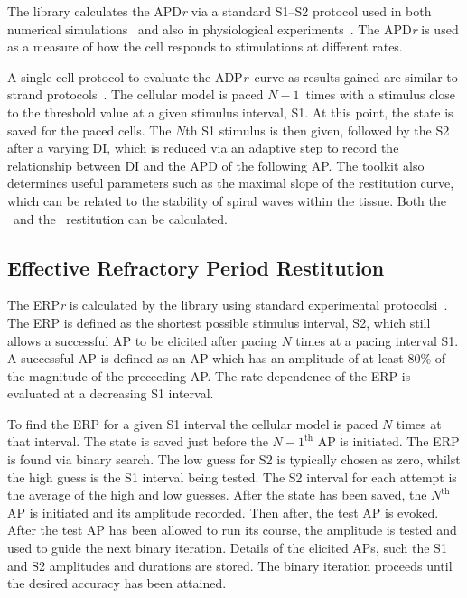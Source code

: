 The library calculates the APD\emph{r} via a standard S1--S2 protocol used in both
numerical simulations~\cite{Kim2002,Xie2002,Qu1999,Cherry2004,Cherry2007,Decker2009} and also in physiological
experiments~\cite{Boyett1978,Taggart1996}.  The APD\emph{r} is used
as a measure of how the cell responds to stimulations at different rates.

A single cell protocol to evaluate the ADP\emph{r}\ curve as results gained are
similar to strand protocols~\cite{Xie2002,Decker2009}.
The cellular model is paced $N-1$\ times with a stimulus close to the threshold
value at a given stimulus interval, S1.  At this point, the state is saved for the
paced cells.  The $N$th S1 stimulus is then given, followed by the S2 after a
varying DI, which is reduced via an adaptive step to record the relationship
between DI and the APD of the following AP.  The toolkit also determines useful
parameters such as the maximal slope of the restitution curve, which can be
related to the stability of spiral waves within the tissue.  Both the \apdr\ and
the \apdr[50]\ restitution can be calculated.

\subsection{Effective Refractory Period Restitution}

The ERP\emph{r} is calculated by the library using standard experimental
protocolsi~\cite{Workman2001,Kharche2008}.
The ERP is defined as the shortest possible stimulus interval, S2, which still
allows a successful AP to be elicited after pacing $N$ times at a pacing
interval S1.  A successful AP is defined as an AP which has an amplitude
of at least 80\% of the magnitude of the preceeding AP.  
The rate dependence of the ERP is evaluated at a decreasing S1 interval.

To find the ERP for a given S1 interval the cellular model is paced $N$ times
at that interval.
The state is saved just before the $N-1^{\text{th}}$ AP is initiated.
The ERP is found via binary search.
The low guess for S2 is typically chosen as zero, whilst the high guess is the
S1 interval being tested.
The S2 interval for each attempt is the average of the high and low guesses.
After the state has been saved, the $N^{\text{th}}$ AP is initiated and its
amplitude recorded.
Then  after, the test AP is evoked.
After the test AP has been allowed to run its course, the amplitude is tested
and used to guide the next binary iteration.
Details of the elicited APs, such the S1 and S2 amplitudes and durations are
stored.
The binary iteration proceeds until the desired accuracy has been attained.

